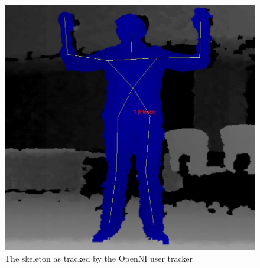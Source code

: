 \documentclass[a4paper]{article}
\begin{document}
 \begin{figure}[htp]
\centering
\includegraphics[scale=0.2]{usertracker.png} 
\caption{The skeleton as tracked by the OpenNI user tracker}
\label{fig:skeleton}
\end{figure}
\end{document}
